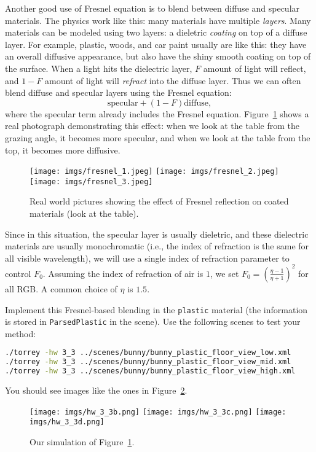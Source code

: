 Another good use of Fresnel equation is to blend between diffuse and specular materials. The physics work like this: many materials have multiple \emph{layers}. Many materials can be modeled using two layers: a dieletric \emph{coating} on top of a diffuse layer. For example, plastic, woods, and car paint usually are like this: they have an overall diffusive appearance, but also have the shiny smooth coating on top of the surface. When a light hits the dielectric layer, $F$ amount of light will reflect, and $1 - F$ amount of light will \emph{refract} into the diffuse layer. Thus we can often blend diffuse and specular layers using the Fresnel equation:
\begin{equation}
\text{specular} + (1 - F) \text{diffuse},
\end{equation}
where the specular term already includes the Fresnel equation. Figure~\ref{fig:real_world_fresnel} shows a real photograph demonstrating this effect: when we look at the table from the grazing angle, it becomes more specular, and when we look at the table from the top, it becomes more diffusive.
\begin{figure}[ht]
    \centering
    \texttt{[image: imgs/fresnel\_1.jpeg]}
    \texttt{[image: imgs/fresnel\_2.jpeg]}
    \texttt{[image: imgs/fresnel\_3.jpeg]}
    \caption{Real world pictures showing the effect of Fresnel reflection on coated materials (look at the table).}
    \label{fig:real_world_fresnel}
\end{figure}
Since in this situation, the specular layer is usually dieletric, and these dielectric materials are usually monochromatic (i.e., the index of refraction is the same for all visible wavelength), we will use a single index of refraction parameter to control $F_0$. Assuming the index of refraction of air is $1$, we set $F_0 = \left(\frac{\eta - 1}{\eta + 1}\right)^2$ for all RGB. A common choice of $\eta$ is $1.5$.

Implement this Fresnel-based blending in the \lstinline{plastic} material (the information is stored in \lstinline{ParsedPlastic} in the scene). Use the following scenes to test your method:
\begin{lstlisting}[language=bash]
./torrey -hw 3_3 ../scenes/bunny/bunny_plastic_floor_view_low.xml
./torrey -hw 3_3 ../scenes/bunny/bunny_plastic_floor_view_mid.xml
./torrey -hw 3_3 ../scenes/bunny/bunny_plastic_floor_view_high.xml
\end{lstlisting}
You should see images like the ones in Figure~\ref{fig:bunny_fresnel}.
\begin{figure}[ht]
    \centering
    \texttt{[image: imgs/hw\_3\_3b.png]}
    \texttt{[image: imgs/hw\_3\_3c.png]}
    \texttt{[image: imgs/hw\_3\_3d.png]}
    \caption{Our simulation of Figure~\ref{fig:real_world_fresnel}.}
    \label{fig:bunny_fresnel}
\end{figure}

